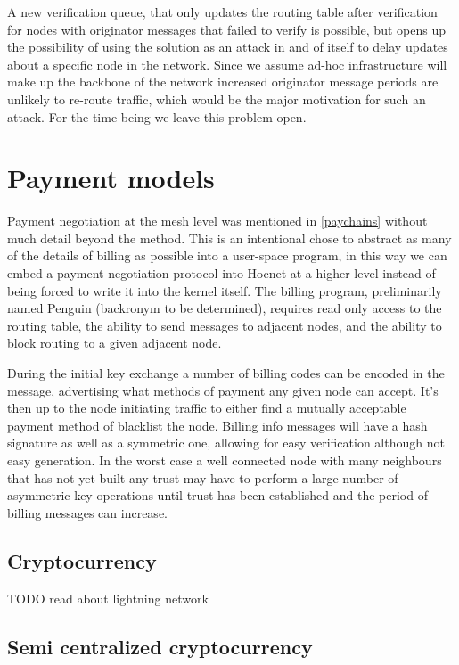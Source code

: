 \documentclass[11pt]{article}
\begin{document}
                      A new verification queue, that only updates the routing table after verification for nodes with originator messages that failed to verify is possible, but opens up the possibility of using the solution as an attack in and of itself to delay updates about a specific node in the network. Since we assume ad-hoc infrastructure will make up the backbone of the network increased originator message periods are unlikely to re-route traffic, which would be the major motivation for such an attack. For the time being we leave this problem open.
                
\section{Payment models} \label{pay}

    Payment negotiation at the mesh level was mentioned in \ref{paychains} without much detail beyond the method. This is an intentional chose to abstract as many of the details of billing as possible into a user-space program, in this way we can embed a payment negotiation protocol into Hocnet at a higher level instead of being forced to write it into the kernel itself. The billing program, preliminarily named Penguin (backronym to be determined), requires read only access to the routing table, the ability to send messages to adjacent nodes, and the ability to block routing to a given adjacent node.
    
    During the initial key exchange a number of billing codes can be encoded in the message, advertising what methods of payment any given node can accept. It's then up to the node initiating traffic to either find a mutually acceptable payment method of blacklist the node. Billing info messages will have a hash signature as well as a symmetric one, allowing for easy verification although not easy generation. In the worst case a well connected node with many neighbours that has not yet built any trust may have to perform a large number of asymmetric key operations until trust has been established and the period of billing messages can increase.

    \subsection{Cryptocurrency}
    
          TODO read about lightning network
    
    \subsection{Semi centralized cryptocurrency}
\end{document}
